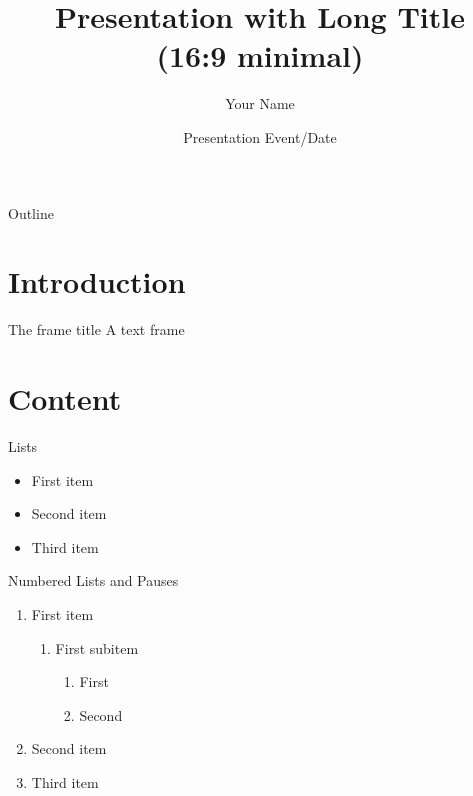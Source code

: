 \documentclass[aspectratio=169]{beamer}
\title[Short Title]{Presentation with Long Title\\(16:9 minimal)}
\author{Your Name}
\date{Presentation Event/Date}
\institute{Short Institute}
\begin{document}
\begin{frame}[plain]
  \maketitle
\end{frame}


\begin{frame}{Outline}
  \tableofcontents
\end{frame}


\section{Introduction}

\begin{frame}{The frame title}
  A text frame
\end{frame}


\section{Content}

\begin{frame}{Lists}
  \begin{itemize}
    \item First item
    \item Second item
    \item Third item
  \end{itemize}
\end{frame}


\begin{frame}{Numbered Lists and Pauses}
  \begin{enumerate}
    \item First item
      \begin{enumerate}
        \item First subitem
          \begin{enumerate}
            \item First 
            \item Second
          \end{enumerate}
      \end{enumerate}
      \pause
    \item Second item
      \pause
    \item Third item
  \end{enumerate}
\end{frame}
\end{document}
